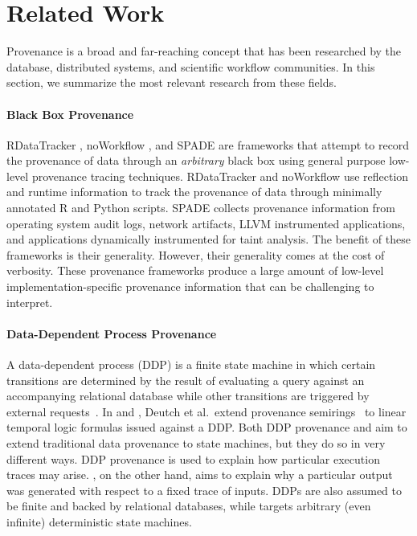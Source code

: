 \section{Related Work}
%
%
Provenance is a broad and far-reaching concept that has been researched by the
database, distributed systems, and scientific workflow communities. In this
section, we summarize the most relevant research from these fields.

\paragraph{Black Box Provenance}
RDataTracker \cite{lerner2014collecting}, noWorkflow
\cite{murta2014noworkflow}, and SPADE \cite{gehani2012spade} are frameworks
that attempt to record the provenance of data through an \emph{arbitrary} black
box using general purpose low-level provenance tracing techniques. RDataTracker
and noWorkflow use reflection and runtime information to track the provenance
of data through minimally annotated R and Python scripts. SPADE collects
provenance information from operating system audit logs, network artifacts,
LLVM instrumented applications, and applications dynamically instrumented for
taint analysis. The benefit of these frameworks is their generality. However,
their generality comes at the cost of verbosity. These provenance frameworks
produce a large amount of low-level implementation-specific provenance
information that can be challenging to interpret.

\paragraph{Data-Dependent Process Provenance}
A data-dependent process (DDP) is a finite state machine in which certain
transitions are determined by the result of evaluating a query against an
accompanying relational database while other transitions are triggered by
external requests~\cite{deutch2014provenance, deutch2015provenance}. In
\cite{deutch2014provenance} and \cite{deutch2015provenance}, Deutch et al.\
extend provenance semirings~\cite{green2007provenance} to linear temporal logic
formulas issued against a DDP.
%
Both DDP provenance and \watprovenance{} aim to extend traditional data
provenance to state machines, but they do so in very different ways. DDP
provenance is used to explain how particular execution traces may arise.
%
%
\Watprovenance{}, on the other hand, aims to explain why a particular output
was generated with respect to a fixed trace of inputs. DDPs are also assumed to
be finite and backed by relational databases, while \watprovenance{} targets
arbitrary (even infinite) deterministic state machines.

